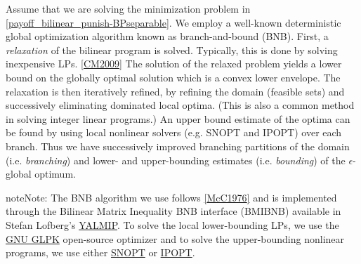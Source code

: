 \documentclass[a4paper,10pt,english]{sphinxmanual}
\begin{document}
\begin{DUlineblock}{0em}
\item[] 
\end{DUlineblock}

Assume that we are solving the minimization problem in \eqref{payoff_bilinear_punish-BPseparable}. We employ a well-known deterministic global optimization algorithm known as branch-and-bound (BNB). First, a \emph{relaxation} of the bilinear program is solved. Typically, this is done by solving inexpensive LPs. {\hyperref[payoff_bilinear_punish:cm2009]{{[}CM2009{]}}} The solution of the relaxed problem yields a lower bound on the globally optimal solution which is a convex lower envelope. The relaxation is then iteratively refined, by refining the domain (feasible sets) and successively eliminating dominated local optima. (This is also a common method in solving integer linear programs.) An upper bound estimate of the optima can be found by using local nonlinear solvers (e.g. SNOPT and IPOPT) over each branch. Thus we have successively improved branching partitions of the domain (i.e. \emph{branching}) and lower- and upper-bounding estimates (i.e. \emph{bounding}) of the $\epsilon$-global optimum.

\begin{notice}{note}{Note:}
The BNB algorithm we use follows {\hyperref[sampling:mcc1976]{{[}McC1976{]}}} and is implemented through the
Bilinear Matrix Inequality BNB interface (BMIBNB) available in Stefan
Lofberg's \href{http://users.isy.liu.se/johanl/yalmip/pmwiki.php?n=Solvers.BMIBNB}{YALMIP}. To solve the local lower-bounding LPs, we use the \href{http://www.gnu.org/software/glpk/}{GNU GLPK} open-source optimizer and to solve the upper-bounding nonlinear programs, we use either \href{http://www.sbsi-sol-optimize.com/asp/sol\_products\_snopt\_desc.htm}{SNOPT} or \href{https://projects.coin-or.org/Ipopt}{IPOPT}.
\end{notice}
\end{document}
